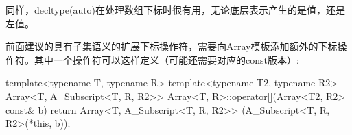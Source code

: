 同样，decltype(auto)在处理数组下标时很有用，无论底层表示产生的是值，还是左值。

前面建议的具有子集语义的扩展下标操作符，需要向Array模板添加额外的下标操作符。其中一个操作符可以这样定义（可能还需要对应的const版本）:

\begin{cpp}
template<typename T, typename R>
template<typename T2, typename R2>
Array<T, A_Subscript<T, R, R2>>
Array<T, R>::operator[](Array<T2, R2> const& b) {
	return Array<T, A_Subscript<T, R, R2>>
		(A_Subscript<T, R, R2>(*this, b));
}
\end{cpp}













